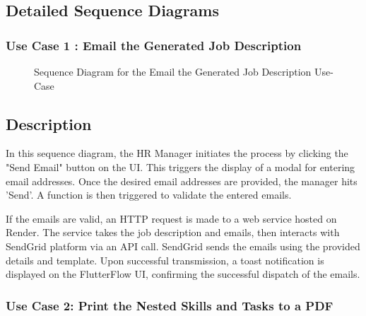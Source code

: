 \newpage
\subsection{Detailed Sequence Diagrams}
\subsubsection{Use Case 1 : Email the Generated Job Description} 

\begin{figure}[H]
    \centering
    \caption{ Sequence Diagram for the Email the Generated Job Description Use-Case }
    \label{fig:UseCase1Sprint3_Sequence_Diagram}
\end{figure}

\subsection*{Description}
In this sequence diagram, the HR Manager initiates the process by clicking the "Send Email" button on the UI. This triggers the display of a modal for entering email addresses. Once the desired email addresses are provided, the manager hits 'Send'. A function is then triggered to validate the entered emails.

If the emails are valid, an HTTP request is made to a web service hosted on Render. The service takes the job description and emails, then interacts with SendGrid platform via an API call. SendGrid sends the emails using the provided details and template. Upon successful transmission, a toast notification is displayed on the FlutterFlow UI, confirming the successful dispatch of the emails.


\subsubsection{Use Case 2: Print the Nested Skills and Tasks to a PDF} 

